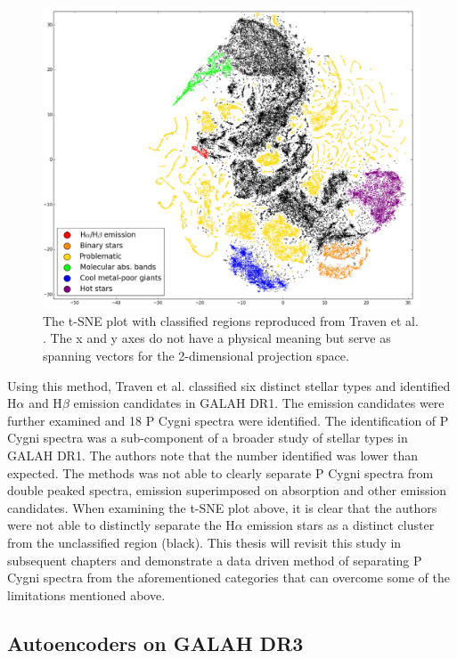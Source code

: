\begin{figure}[h]
\centering
\includegraphics[scale=0.40]{figures/tsne traven.png}
\caption{The t-SNE plot with classified regions reproduced from Traven et al. \cite{traven2017galah}. The x and y axes do not have a physical meaning but serve as spanning vectors for the 2-dimensional projection space.}
\end{figure}

Using this method, Traven et al. classified six distinct stellar types and identified H$\alpha$ and H$\beta$ emission candidates in GALAH DR1. The emission candidates were further examined and 18 P Cygni spectra were identified. The identification of P Cygni spectra was a sub-component of a broader study of stellar types in GALAH DR1. The authors note that the number identified was lower than expected. The methods was not able to clearly separate P Cygni spectra from double peaked spectra, emission superimposed on absorption and other emission candidates. When examining the t-SNE plot above, it is clear that the authors were not able to distinctly separate the H$\alpha$ emission stars as a distinct cluster from the unclassified region (black). This thesis will revisit this study in subsequent chapters and demonstrate a data driven method of separating P Cygni spectra from the aforementioned categories that can overcome some of the limitations mentioned above.

\subsection{Autoencoders on GALAH DR3}


